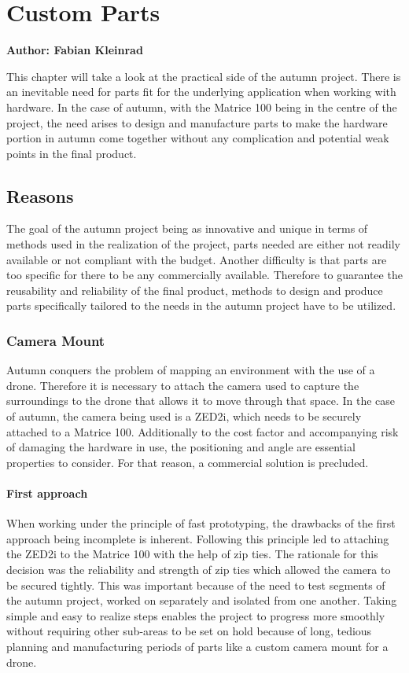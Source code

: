 \chapter{Custom Parts}

\textbf{Author: Fabian Kleinrad} 

This chapter will take a look at the practical side of the autumn project. There is an inevitable need for parts fit for the underlying application when working with hardware. In the case of autumn, with the Matrice 100 being in the centre of the project, the need arises to design and manufacture parts to make the hardware portion in autumn come together without any complication and potential weak points in the final product.

\section{Reasons}

The goal of the autumn project being as innovative and unique in terms of methods used in the realization of the project, parts needed are either not readily available or not compliant with the budget. Another difficulty is that parts are too specific for there to be any commercially available. Therefore to guarantee the reusability and reliability of the final product, methods to design and produce parts specifically tailored to the needs in the autumn project have to be utilized.

\subsection{Camera Mount}

Autumn conquers the problem of mapping an environment with the use of a drone. Therefore it is necessary to attach the camera used to capture the surroundings to the drone that allows it to move through that space. In the case of autumn, the camera being used is a ZED2i, which needs to be securely attached to a Matrice 100. Additionally to the cost factor and accompanying risk of damaging the hardware in use, the positioning and angle are essential properties to consider. For that reason, a commercial solution is precluded.

\subsubsection{First approach}

When working under the principle of fast prototyping, the drawbacks of the first approach being incomplete is inherent. Following this principle led to attaching the ZED2i to the Matrice 100 with the help of zip ties. The rationale for this decision was the reliability and strength of zip ties which allowed the camera to be secured tightly. This was important because of the need to test segments of the autumn project, worked on separately and isolated from one another. Taking simple and easy to realize steps enables the project to progress more smoothly without requiring other sub-areas to be set on hold because of long, tedious planning and manufacturing periods of parts like a custom camera mount for a drone.

